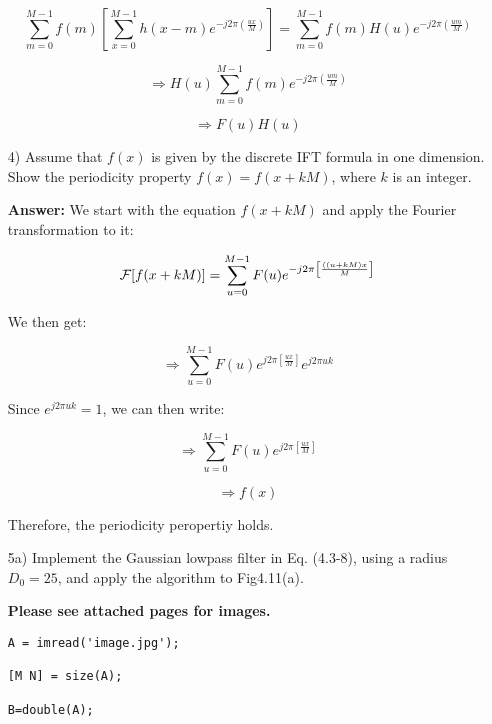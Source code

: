 \documentclass{article}
\begin{document}
\begin{enumerate}
\begin{equation}
\sum_{m=0}^{M-1} f(m) \left[ \sum_{x=0}^{M-1} h(x-m) e^{-j2\pi \left( \frac{ux}{M}\right)} \right] = \sum_{m=0}^{M-1} f(m) H(u) e^{-j2\pi \left( \frac{um}{M}\right)}
\end{equation}

\begin{equation}
\Rightarrow H(u) \sum_{m=0}^{M-1} f(m)  e^{-j2\pi \left( \frac{um}{M}\right)}
\end{equation}

\begin{equation}
\Rightarrow F(u)H(u)
\end{equation}

\item[4)] Assume that $f(x)$ is given by the discrete IFT formula in one dimension. Show the periodicity property $f(x)=f(x+kM)$, where $k$ is an integer. 

\textbf{Answer: }We start with the equation $f(x +kM)$ and apply the Fourier transformation to it:

$$ {\cal F}[f(x + kM)] = \sum_{u=0}^{M-1} F(u) e^{-j2\pi \left[ \frac{((u + kM)x}{M} \right]}$$

We then get:

\begin{equation}
\Rightarrow \sum_{u=0}^{M-1} F(u) e^{j2\pi \left[ \frac{ux}{M} \right]} e^{j2\pi uk}
\end{equation}

Since $e^{j2\pi uk} = 1$, we can then write:

\begin{equation}
\Rightarrow \sum_{u=0}^{M-1} F(u) e^{j2\pi \left[ \frac{ux}{M} \right]}
\end{equation}

\begin{equation}
\Rightarrow f(x)
\end{equation}

Therefore, the periodicity peropertiy holds.

\newpage
\item[5a)] Implement the Gaussian lowpass filter in Eq. (4.3-8), using a 
radius $D_0=25$, and apply the algorithm to Fig4.11(a).  

\textbf{Please see attached pages for images.}

\begin{lstlisting}
A = imread('image.jpg');

[M N] = size(A); 

B=double(A);


\end{lstlisting}
\end{enumerate}
\end{document}

